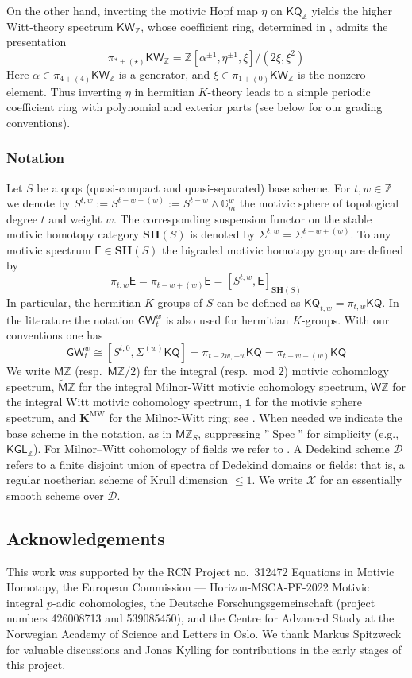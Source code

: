 \documentclass[11pt,hyp,english]{article}
\newcommand{\E}{\mathsf{E}}
\newcommand{\Z}{\mathbb{Z}}
\newcommand{\unit}{\mathds{1}}
\newcommand{\KGL}{\mathsf{KGL}}
\newcommand{\KQ}{\mathsf{KQ}}
\newcommand{\KW}{\mathsf{KW}}
\newcommand{\GW}{\mathsf{GW}}
\newcommand{\MZ}{\mathsf{M}\Z}
\newcommand{\HZ}{\mathsf{M}\Z}
\newcommand{\cHZ}{\wt{{\mathsf{M}}}{\Z}}
\newcommand{\HWZ}{\mathsf{W}\Z}
\newcommand{\SH}{\mathbf{SH}}
\newcommand{\Spec}{\operatorname{Spec}}
\newcommand{\wt}[1]{\widetilde{#1}}
\newcommand{\KMW}{\mathbf{K}^\mathrm{MW}}
\newcommand{\bideg}{(\star)}
\theoremstyle{definition}
\begin{document}
On the other hand, inverting the motivic Hopf map $\eta$ on $\KQ_\Z$ yields the higher Witt-theory 
spectrum $\KW_\Z$, whose coefficient ring, determined in , admits the presentation
\[
  \pi_{\ast+\bideg}\KW_\Z = \Z[\alpha^{\pm 1},\eta^{\pm 1}, \xi]/(2\xi,\xi^2)
\]
Here $\alpha \in \pi_{4+(4)}\KW_\Z$ is a generator, and $\xi \in \pi_{1+(0)}\KW_\Z$ is the nonzero element. 
Thus inverting $\eta$ in hermitian $K$-theory leads to a simple periodic coefficient ring with polynomial and exterior parts (see below for our grading conventions).



\subsubsection*{Notation}
Let $S$ be a qcqs (quasi-compact and quasi-separated) base scheme.
For $t,w\in \Z$ we denote by
$S^{t,w}:=S^{t-w+(w)}:= S^{t-w}\wedge \mathbb{G}_{m}^{w}$ the motivic sphere of 
topological degree $t$ and weight $w$.
The corresponding suspension functor on the stable motivic homotopy category $\SH(S)$ 
is denoted by $\Sigma^{t,w}=\Sigma^{t-w+(w)}$.
To any motivic spectrum $\E\in\SH(S)$ the bigraded motivic homotopy group are defined by 
\[
\pi_{t,w}\E=
\pi_{t-w+(w)}\E=
[S^{t,w},\E]_{\SH(S)}
\]
In particular, 
the hermitian $K$-groups of $S$ can be defined as 
$\KQ_{t,w}=\pi_{t,w}\KQ$.
In the literature the notation $\GW^w_t$ is also used for hermitian $K$-groups. 
With our conventions one has
\[
\GW^{w}_{t}\cong [S^{t,0}, \Sigma^{(w)}\KQ]=\pi_{t-2w,-w}\KQ=\pi_{t-w-(w)}\KQ
\]
We write $\HZ$ (resp.\ $\HZ/2$) for the integral (resp.\ mod $2$) motivic cohomology spectrum, 
$\cHZ$ for the integral Milnor-Witt motivic cohomology spectrum, 
$\HWZ$ for the integral Witt motivic cohomology spectrum, $\unit$ for the motivic sphere spectrum,
and $\KMW$ for the Milnor-Witt ring; 
see \cite{2020arXiv200406634B,MorelICM06}.
When needed we indicate the base scheme in the notation, 
as in $\MZ_S$, suppressing ''$\Spec$'' for simplicity (e.g., $\KGL_\Z$).
For Milnor–Witt cohomology of fields we refer to \cite{deglise2023notesmilnorwittktheory}.
A Dedekind scheme $\mathcal{D}$ refers to a finite disjoint union of spectra of Dedekind 
domains or fields;
that is, a regular noetherian scheme of Krull dimension $\leq 1$.
We write $\mathcal{X}$ for an essentially smooth scheme over $\mathcal{D}$.



\subsection*{Acknowledgements}
This work was supported by the RCN Project no.~312472 Equations in Motivic Homotopy, the European Commission — Horizon-MSCA-PF-2022 Motivic integral $p$-adic cohomologies, the Deutsche Forschungsgemeinschaft (project numbers 426008713 and 539085450), and the Centre for Advanced Study at the Norwegian Academy of Science and Letters in Oslo. We thank Markus Spitzweck for valuable discussions and Jonas Kylling for contributions in the early stages of this project.
\end{document}
